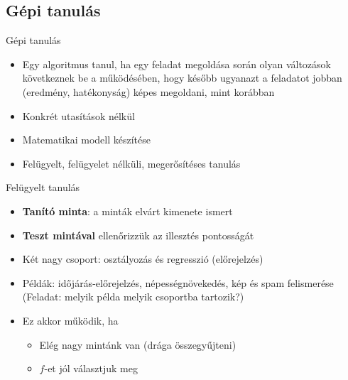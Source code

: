 \subsection{Gépi tanulás}
\begin{frame}{Gépi tanulás}
    \begin{itemize}
        \item Egy algoritmus tanul, ha egy feladat megoldása során olyan változások következnek be a működésében, hogy később ugyanazt a feladatot jobban (eredmény, hatékonyság) képes megoldani, mint korábban
        \item Konkrét utasítások nélkül
        \item Matematikai modell készítése
        \item Felügyelt, felügyelet nélküli, megerősítéses tanulás
    \end{itemize}
\end{frame}

\begin{frame}{Felügyelt tanulás}
    \begin{itemize}
        \item {\bf Tanító minta}: a minták elvárt kimenete ismert
        \item {\bf Teszt mintával} ellenőrizzük az illesztés pontosságát
        \item Két nagy csoport: osztályozás és regresszió (előrejelzés)
        \item Példák: időjárás-előrejelzés, népességnövekedés, kép és spam felismerése (Feladat: melyik példa melyik csoportba tartozik?)
        \item Ez akkor működik, ha
        \begin{itemize}
            \item Elég nagy mintánk van (drága összegyűjteni)
            \item $f$-et jól választjuk meg
        \end{itemize}
    \end{itemize}
    
\end{frame}

